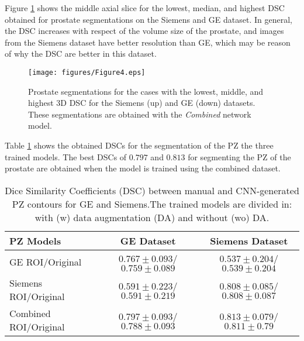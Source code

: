 Figure \ref{fig:resseg} shows the middle axial slice for the lowest, median, and highest DSC obtained for prostate segmentations on the Siemens and GE dataset. In general, the DSC increases with respect of the volume size of the prostate, and images from the Siemens dataset have better resolution than GE, which may be reason of why the DSC are better in this dataset. 
\begin{figure}[h]
    \centering
    \texttt{[image: figures/Figure4.eps]}
    \caption{Prostate segmentations for the cases with the lowest, middle, and highest 3D DSC for the Siemens (up) and GE (down) datasets. These segmentations are obtained with the \emph{Combined} network model.  }
    \label{fig:resseg}
\end{figure} 

Table \ref{tab:res_pz} shows the obtained DSCs for the segmentation of the PZ the three trained models.  The best DSCs of $0.797$ and $0.813$ for segmenting the PZ of the prostate are obtained when the model is trained using the combined dataset.  
 \begin{table}[h]
    \label{tab:res_pz}
    \caption{Dice Similarity Coefficients (DSC) between manual and CNN-generated PZ contours for GE and Siemens.The trained models are divided in: with (w) data augmentation (DA) and without (wo) DA.}
    \begin{tabular}{lcc}
         \hline
          \textbf{PZ Models} & \textbf{GE Dataset} & \textbf{Siemens Dataset}\\
         \hline
         GE ROI/Original & $0.767\pm0.093$/$0.759\pm0.089$ & $0.537\pm0.204$/$0.539\pm0.204$ \\
         \hline
         Siemens ROI/Original & $0.591\pm0.223$/$0.591\pm0.219$ & $0.808\pm0.085$/$0.808\pm0.087$ \\
         \hline
         Combined ROI/Original & $\mathbf{0.797\pm0.093}$/$0.788\pm0.093$ & $\mathbf{0.813\pm0.079}$/$0.811\pm0.79$\\
         \hline
    \end{tabular}
\end{table}

